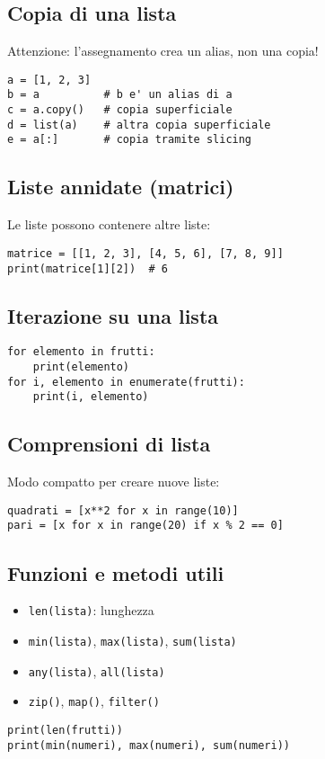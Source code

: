 \documentclass[a4paper,12pt]{article}
\begin{document}
\subsection*{Copia di una lista}
Attenzione: l'assegnamento crea un alias, non una copia!
\begin{lstlisting}
a = [1, 2, 3]
b = a          # b e' un alias di a
c = a.copy()   # copia superficiale
d = list(a)    # altra copia superficiale
e = a[:]       # copia tramite slicing
\end{lstlisting}

\subsection*{Liste annidate (matrici)}
Le liste possono contenere altre liste:
\begin{lstlisting}
matrice = [[1, 2, 3], [4, 5, 6], [7, 8, 9]]
print(matrice[1][2])  # 6
\end{lstlisting}

\subsection*{Iterazione su una lista}
\begin{lstlisting}
for elemento in frutti:
    print(elemento)
for i, elemento in enumerate(frutti):
    print(i, elemento)
\end{lstlisting}

\subsection*{Comprensioni di lista}
Modo compatto per creare nuove liste:
\begin{lstlisting}
quadrati = [x**2 for x in range(10)]
pari = [x for x in range(20) if x % 2 == 0]
\end{lstlisting}

\subsection*{Funzioni e metodi utili}
\begin{itemize}
    \item \texttt{len(lista)}: lunghezza
    \item \texttt{min(lista)}, \texttt{max(lista)}, \texttt{sum(lista)}
    \item \texttt{any(lista)}, \texttt{all(lista)}
    \item \texttt{zip()}, \texttt{map()}, \texttt{filter()}
\end{itemize}
\begin{lstlisting}
print(len(frutti))
print(min(numeri), max(numeri), sum(numeri))
\end{lstlisting}
\end{document}
